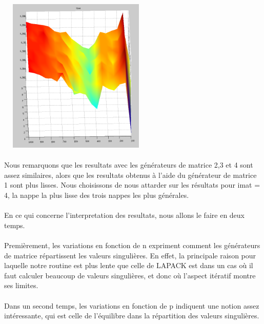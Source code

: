 \documentclass[a4paper,12pt]{article}
\begin{document}
    \begin{center}
    \includegraphics[width=20em, height=20em]{imat4.png}
    \end{center}

    \paragraph{}
    Nous remarquons que les resultats avec les générateurs de matrice 2,3 et 4
    sont assez similaires, alors que les resultats obtenus à l'aide du générateur
    de matrice 1 sont plus lisses. Nous choisissons de nous attarder sur les résultats
    pour imat = 4, la nappe la plus lisse des trois nappes les plus générales.

    \paragraph{}
    En ce qui concerne l'interpretation des resultats, nous allons le faire en deux temps.

    \bigskip

    \paragraph{}
    Premièrement, les variations en fonction de n expriment comment les générateurs
    de matrice répartissent les valeurs singulières. En effet, la principale raison pour
    laquelle notre routine est plus lente que celle de LAPACK est dans un cas où
    il faut calculer beaucoup de valeurs singulières, et donc où l'aspect itératif
    montre ses limites.

    \paragraph{}
    Dans un second temps, les variations en fonction de p indiquent une notion
    assez intéressante, qui est celle de l'équilibre dans la répartition des
    valeurs singulières.
\end{document}
